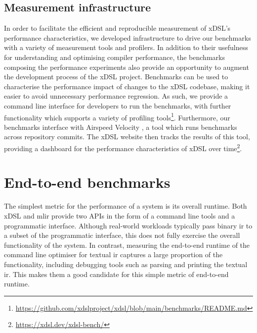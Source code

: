 \vspace{2em}


\subsection{Measurement infrastructure}
\label{ssec:infrastructure}

In order to facilitate the efficient and reproducible measurement of xDSL's performance characteristics, we developed infrastructure to drive our benchmarks with a variety of measurement tools and profilers.
In addition to their usefulness for understanding and optimising compiler performance, the benchmarks composing the performance experiments also provide an opportunity to augment the development process of the xDSL project.
Benchmarks can be used to characterise the performance impact of changes to the xDSL codebase, making it easier to avoid unnecessary performance regression.
As such, we provide a command line interface for developers to run the benchmarks, with further functionality which supports a variety of profiling tools\footnote{\scriptsize{\url{https://github.com/xdslproject/xdsl/blob/main/benchmarks/README.md}}}.
Furthermore, our benchmarks interface with Airspeed Velocity \cite{michaeldroettboomAirspeedvelocityAsv2025}, a tool which runs benchmarks across repository commits. The xDSL website then tracks the results of this tool, providing a dashboard for the performance characteristics of xDSL over time\footnote{\scriptsize{\url{https://xdsl.dev/xdsl-bench/}}}.















\section{End-to-end benchmarks}
\label{sec:e2e-benchmarks}

The simplest metric for the performance of a system is its overall runtime.
Both xDSL and \ac{mlir} provide two APIs in the form of a command line tools and a programmatic interface. Although real-world workloads typically pass binary \ac{ir} to a subset of the programmatic interface, this does not fully exercise the overall functionality of the system. In contrast, measuring the end-to-end runtime of the command line optimiser for textual \ac{ir} captures a large proportion of the functionality, including debugging tools such as parsing and printing the textual \ac{ir}.
This makes them a good candidate for this simple metric of end-to-end runtime.

